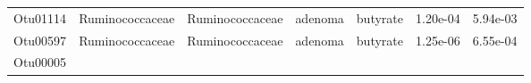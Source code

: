 \documentclass[11pt,]{article}
\begin{document}
\begin{longtable}[]{@{}ccccccc@{}}
\begin{minipage}[t]{0.09\columnwidth}\centering\strut
Otu01114\strut
\end{minipage} & \begin{minipage}[t]{0.17\columnwidth}\centering\strut
Ruminococcaceae\strut
\end{minipage} & \begin{minipage}[t]{0.17\columnwidth}\centering\strut
Ruminococcaceae\strut
\end{minipage} & \begin{minipage}[t]{0.09\columnwidth}\centering\strut
adenoma\strut
\end{minipage} & \begin{minipage}[t]{0.11\columnwidth}\centering\strut
butyrate\strut
\end{minipage} & \begin{minipage}[t]{0.09\columnwidth}\centering\strut
1.20e-04\strut
\end{minipage} & \begin{minipage}[t]{0.09\columnwidth}\centering\strut
5.94e-03\strut
\end{minipage}\tabularnewline
\begin{minipage}[t]{0.09\columnwidth}\centering\strut
Otu00597\strut
\end{minipage} & \begin{minipage}[t]{0.17\columnwidth}\centering\strut
Ruminococcaceae\strut
\end{minipage} & \begin{minipage}[t]{0.17\columnwidth}\centering\strut
Ruminococcaceae\strut
\end{minipage} & \begin{minipage}[t]{0.09\columnwidth}\centering\strut
adenoma\strut
\end{minipage} & \begin{minipage}[t]{0.11\columnwidth}\centering\strut
butyrate\strut
\end{minipage} & \begin{minipage}[t]{0.09\columnwidth}\centering\strut
1.25e-06\strut
\end{minipage} & \begin{minipage}[t]{0.09\columnwidth}\centering\strut
6.55e-04\strut
\end{minipage}\tabularnewline
\begin{minipage}[t]{0.09\columnwidth}\centering\strut
Otu00005\strut
\end{minipage} & \begin{minipage}[t]{0.17\columnwidth}\centering\strut

\end{minipage}
\end{longtable}
\end{document}
